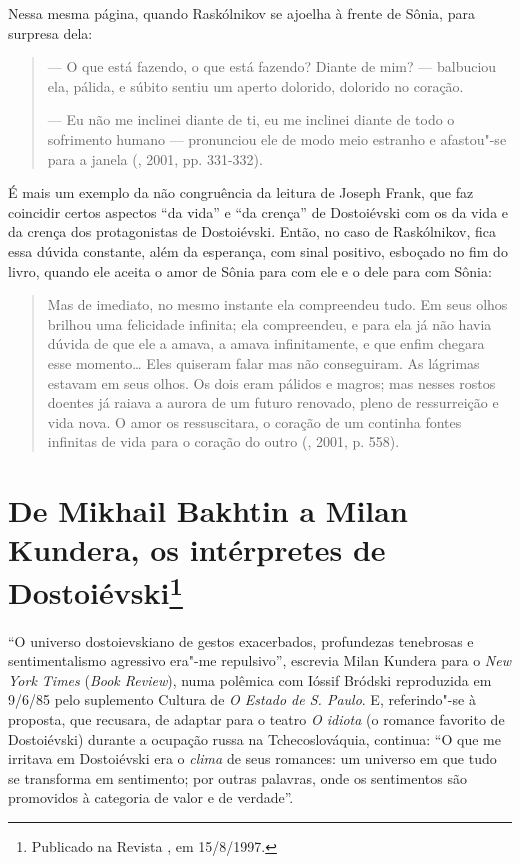 Nessa mesma página, quando Raskólnikov se ajoelha à frente de Sônia,
para surpresa dela:

\begin{quotation}
--- O que está fazendo, o que está fazendo? Diante de mim? --- balbuciou
ela, pálida, e súbito sentiu um aperto dolorido, dolorido no coração.

--- Eu não me inclinei diante de ti, eu me inclinei diante de todo o
sofrimento humano --- pronunciou ele de modo meio estranho e afastou"-se
para a janela (, 2001, pp. 331-332).
\end{quotation}

É mais um exemplo da não congruência da leitura de Joseph Frank, que faz
coincidir certos aspectos ``da vida'' e ``da crença'' de Dostoiévski com
os da vida e da crença dos protagonistas de Dostoiévski. Então, no caso
de Raskólnikov, fica essa dúvida constante, além da esperança, com sinal
positivo, esboçado no fim do livro, quando ele aceita o amor de Sônia
para com ele e o dele para com Sônia:

\begin{quotation}
Mas de imediato, no mesmo instante ela compreendeu tudo. Em seus olhos
brilhou uma felicidade infinita; ela compreendeu, e para ela já não
havia dúvida de que ele a amava, a amava infinitamente, e que enfim
chegara esse momento\ldots{} Eles quiseram falar mas não conseguiram. As
lágrimas estavam em seus olhos. Os dois eram pálidos e magros; mas
nesses rostos doentes já raiava a aurora de um futuro renovado, pleno de
ressurreição e vida nova. O amor os ressuscitara, o coração de um
continha fontes infinitas de vida para o coração do outro (, 2001, p. 558).
\end{quotation}

\chapter{De Mikhail Bakhtin a Milan Kundera, os intérpretes de
Dostoiévski\footnote{Publicado na Revista \protect{}, em 15/8/1997.}}
\label{kundera}

``O universo dostoievskiano de gestos exacerbados, profundezas
tenebrosas e sentimen­talismo agressivo era"-me repulsivo'', escrevia
Milan Kundera para o \emph{New York Times} (\emph{Book Review}), numa polêmica
com Ióssif Bródski reproduzida em 9/6/85 pelo suplemento Cultura
de \emph{O Estado de S. Paulo}. E, referindo"-se à proposta, que
recusara, de adaptar para o teatro \emph{O idiota} (o romance favorito
de Dostoiévski) durante a ocupação russa na Tchecoslováquia, continua:
``O que me irritava em Dostoiévski era o \emph{clima} de seus romances:
um universo em que tudo se transforma em sentimento; por outras
palavras, onde os sentimentos são promovidos à categoria de valor e de
verdade''.

